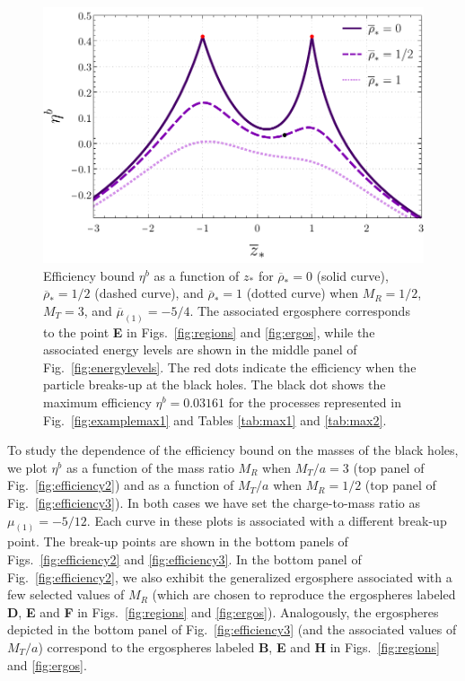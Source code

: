 \begin{figure}[!htbp]
    \centering
    \includegraphics[scale=0.70]{img/penrose_binaries/fig7.pdf}
    \caption{Efficiency bound $\eta ^ b$ as a function of $z_*$ for $\overline \rho_*=0$ (solid curve), $\overline \rho_*=1/2$ (dashed curve), and $\overline \rho_*=1$ (dotted curve) when $M_R=1/2$, $M_T=3$, and $\overline \mu_{(1)} = -5/4$. The associated ergosphere corresponds to the point \textbf{E} in Figs.~\ref{fig:regions} and \ref{fig:ergos}, while the associated energy levels are shown in the middle panel of Fig.~\ref{fig:energylevels}. The red dots indicate the efficiency when the particle breaks-up at the black holes. The black dot shows the maximum efficiency $\eta^b = 0.03161$ for the processes represented in Fig.~\ref{fig:examplemax1} and Tables \ref{tab:max1} and \ref{tab:max2}.}
    \label{fig:efficiency0}
\end{figure}

To study the dependence of the efficiency bound on the masses of the black holes, we plot $\eta ^{b}$ as a function of the mass ratio $M_R$ when $M_T/a=3$ (top panel of Fig.~\ref{fig:efficiency2}) and as a function of $M_T/a$ when $M_R=1/2$  (top panel of Fig.~\ref{fig:efficiency3}). In both cases we have set the charge-to-mass ratio as $\mu_{(1)} = -5/12$. Each curve in these plots is associated with a different break-up point. The break-up points are shown in the bottom panels of Figs.~\ref{fig:efficiency2} and \ref{fig:efficiency3}. In the bottom panel of Fig.~\ref{fig:efficiency2}, we also exhibit the generalized ergosphere associated with a few selected values of $M_R$ (which are chosen to reproduce the ergospheres labeled \textbf{D}, \textbf{E} and \textbf{F} in Figs.~\ref{fig:regions} and \ref{fig:ergos}). Analogously, the ergospheres depicted in the bottom panel of Fig.~\ref{fig:efficiency3} (and the associated values of $M_T/a$) correspond to the ergospheres labeled \textbf{B}, \textbf{E} and \textbf{H} in Figs.~\ref{fig:regions} and \ref{fig:ergos}.

